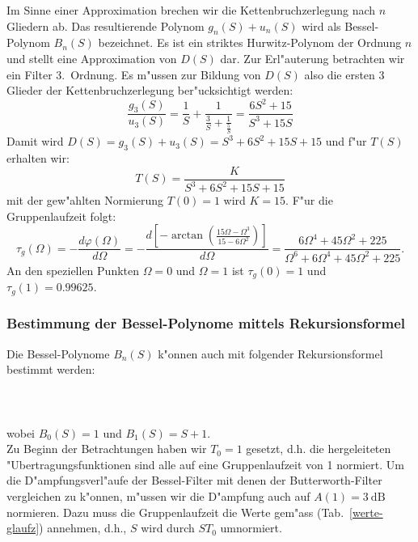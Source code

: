 Im Sinne einer Approximation brechen wir die Kettenbruchzerlegung nach
$n$ Gliedern ab. Das resultierende Polynom $g_{n}(S) + u_{n}(S)$ wird
als Bessel-Polynom $B_{n}(S)$ bezeichnet. Es ist ein striktes
Hurwitz-Polynom der Ordnung $n$ und stellt eine Approximation von
$D(S)$ dar.  Zur Erl"auterung betrachten wir ein Filter 3.~Ordnung. Es
m"ussen zur Bildung von $D(S)$ also die ersten 3 Glieder der
Kettenbruchzerlegung ber"ucksichtigt
werden:
\[
\frac{g_{3}(S)}{u_{3}(S)} 
=\frac{1}{S}+
\displaystyle\frac{1}{
\displaystyle\frac{3}{S}+
\displaystyle\frac{1}{
\displaystyle\frac{5}{S}}}
=\frac{6S^{2}+15}{S^{3}+15S}
\]
Damit wird $D(S)=g_{3} (S) + u_{3} (S)=S^{3}+6S^{2}+ 15 S + 15$
und f"ur $T(S)$ erhalten wir:
\[
T(S)=\frac{K}{S^{3}+6S^{2}+15S+15}
\]
mit der gew"ahlten Normierung $T(0)=1$ wird $K=15$. F"ur die Gruppenlaufzeit
folgt:
\begin{equation*}
\tau_{g}(\Omega)=-\frac{d\varphi(\Omega)}{d\Omega}=-\frac{d \left[ -\arctan{\left(\frac{15\Omega-\Omega^{3}}{15-6\Omega^{2}}\right)}\right]}{d\Omega}=\frac{6\Omega^{4}+45\Omega^{2}+225}{\Omega^{6}+6\Omega^{4}
        +45\Omega^{2}+225}.
\end{equation*}
An den speziellen Punkten $\Omega=0$ und $\Omega=
1$ ist $\tau_{g}(0)=1$ und $\tau_{g}(1)=0.99625$.
\subsubsection{Bestimmung der Bessel-Polynome mittels Rekursionsformel}
Die Bessel-Polynome $B_{n}(S)$ k"onnen auch mit folgender
Rekursionsformel
bestimmt werden:\\~~\\
\\~~\\
wobei $B_0 (S)=1$ und $B_1(S)=S+1$.\\ Zu Beginn der Betrachtungen
haben wir $T_{0}=1$ gesetzt, d.h. die hergeleiteten
"Uber\-tragungs\-funktionen sind alle auf eine
Gruppenlaufzeit von 1 normiert.  Um die
D"ampfungsverl"aufe der Bessel-Filter mit denen der Butterworth-Filter
vergleichen zu k"onnen, m"ussen wir die D"ampfung auch auf
$A(1)=3~\mbox{dB}$ normieren. Dazu muss die Gruppenlaufzeit die Werte
gem"ass (Tab.~\ref{werte-glaufz}) annehmen, d.h., $S$ wird durch $ST_0$ umnormiert.

